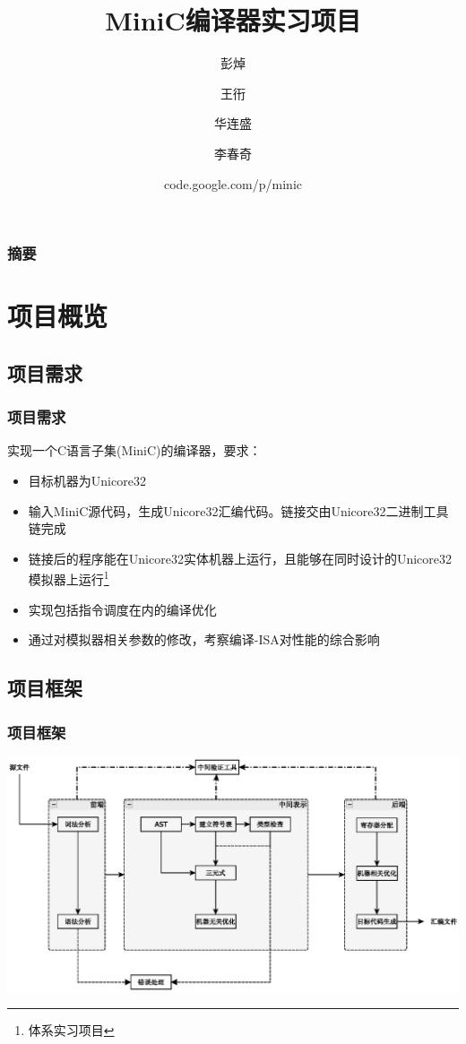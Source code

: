 \documentclass{beamer}
\title{MiniC编译器实习项目}
\author{彭焯\and 王衎 \and 华连盛 \and 李春奇}
\date{code.google.com/p/minic}
\institute{PKU}
\begin{document}
\begin{frame}
  \titlepage
\end{frame}
\frame[allowframebreaks]%
\begin{frame}
  \frametitle{摘要}
  \tableofcontents
\end{frame}


\section{项目概览}
\subsection{项目需求}
\begin{frame}
	\frametitle{项目需求}
	\noindent
	实现一个C语言子集(MiniC)的编译器，要求：
	\begin{itemize}
		\item 目标机器为Unicore32
		\item 输入MiniC源代码，生成Unicore32汇编代码。链接交由Unicore32二进制工具链完成
		\item 链接后的程序能在Unicore32实体机器上运行，且能够在同时设计的Unicore32模拟器上运行\footnote{体系实习项目}
		\item 实现包括指令调度在内的编译优化
		\item 通过对模拟器相关参数的修改，考察编译-ISA对性能的综合影响
	\end{itemize}
\end{frame}

\subsection{项目框架}
\begin{frame}
	\frametitle{项目框架}
	\includegraphics[scale=0.5]{main_structure.eps}
\end{frame}
\end{document}
